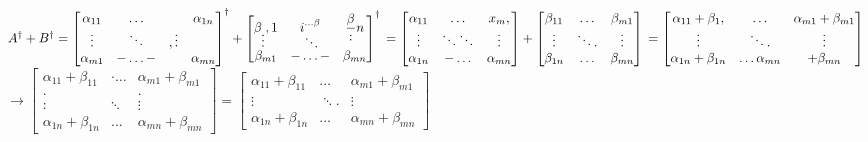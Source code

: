 \documentclass[12pt]{article}
\theoremstyle{plain}
\theoremstyle{nonumberplain}
\theoremstyle{plain}
\theoremstyle{nonumberplain}
\newcommand\1{{\bf 1}}
\newcommand{\<}{\left\langle}
\renewcommand{\>}{\right\rangle}
\begin{document}
\begin{enumerate}[label=(\alph*)]
$A^{\dagger}+B^{\dagger}=\begin{bmatrix}
\alpha _{11} & \ldots  &  & \alpha_{1n} \\
\vdots  & \ddots  & ,\vdots  &  \\
\alpha _{m1} & -\ldots - &  & \alpha _{mn}
\end{bmatrix}^{\dagger}+\begin{bmatrix}
\beta _{\vdots },1 & i_{\ddots }^{\ldots \beta } & \dfrac{\beta}{:}n \\
\beta _{m1} & -\ldots - & \beta _{mn}
\end{bmatrix}^{\dagger}\\
=\begin{bmatrix}
\alpha _{11} & \ldots  & x_{m}, \\
\vdots  & \ddots \ddots  & \vdots  \\
\alpha _{1n} & -\ldots  & \alpha _{mn}
\end{bmatrix}+\begin{bmatrix}
\beta _{11} & \ldots  & \beta _{m1} \\
\vdots  & \ddots . & \vdots  \\
\beta _{1n} & \ldots  & \beta _{mn}
\end{bmatrix}\\
=\begin{bmatrix}
\alpha _{11}+\beta _{1}, & \ldots  & \alpha _{m1}+\beta _{m1} \\
\vdots  & \ddots . & \vdots  \\
\alpha _{1n}+\beta _{1n} & \ldots \alpha _{mn} & +\beta _{mn}
\end{bmatrix}$ \\

$\longrightarrow\begin{bmatrix}
\alpha _{11}+\beta _{11} & \cdot \ldots  & \alpha _{m1}+\beta _{m1} \\
. &  & . \\
: & \ddots  & \vdots  \\
\alpha _{1n}+\beta _{1n} & ... & \alpha _{mn}+\beta _{mn}
\end{bmatrix}=\begin{bmatrix}
\alpha _{11}+\beta _{11} & \ldots  & \alpha _{m1}+\beta _{m1} \\
\vdots  & \ddots . & \vdots  \\
\alpha _{1n}+\beta _{1n} & \ldots  & \alpha _{mn}+\beta _{mn}
\end{bmatrix}$


\end{enumerate}
\end{document}
